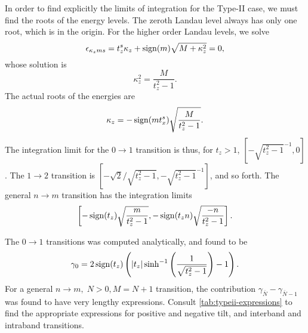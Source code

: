 In order to find explicitly the limits of integration for the Type-II case, we must find the roots of the energy levels.
The zeroth Landau level always has only one root, which is in the origin.
For the higher order Landau levels, we solve
\begin{equation}
  \label{eq:127}
  \epsilon_{\kappa_z m s } = t_z^s \kappa_z + \operatorname{sign}(m) \sqrt{M + \kappa_{z} ^2} = 0,
\end{equation}
whose solution is
\[
\kappa_z^2 = \frac{M}{t_{z}^2 - 1}.
\]
The actual roots of the energies are
\begin{equation}
  \label{eq:128}
  \kappa_z = -\operatorname{sign}(m t^s_x) \sqrt{\frac{M}{t_{z}^2 - 1}}.
\end{equation}
The integration limit for the \( 0 \to 1 \) transition is thus, for \( t_z > 1 \), \( [-\sqrt{t_z^2 - 1 }^{-1}, 0] \).
The \( 1\to 2 \) transition is \( [-\sqrt{2} /\sqrt{t_z^2 - 1}, -\sqrt{t_z^2 - 1 }^{-1}] \), and so forth.
The general \( n \to m \) transition has the integration limits
\[
  \left[-\operatorname{sign}(t_z) \sqrt{\frac{m}{t_{z}^2 - 1}}, -\operatorname{sign}(t_z n) \sqrt{\frac{-n}{t_{z}^2 -1}} \right].
\]

The \( 0\to 1 \) transitions was computed analytically, and found to be
\begin{equation}
  \label{eq:129}
  \gamma_0 =
  2 \operatorname{sign}(t_z)
  \left(
  |t_z| \sinh^{-1}\left(\frac{1}{\sqrt{t_{z}^2-1} }\right) -1
\right  ).
\end{equation}
For a general \( n \to m, \; N>0, M=N+1 \) transition, the contribution \( \gamma_{\bar{N}} - \gamma_{\bar{N}-1} \) was found to have very lengthy expressions.
Consult \cref{tab:typeii-expressions} to find the appropriate expressions for positive and negative tilt, and interband and intraband transitions.

